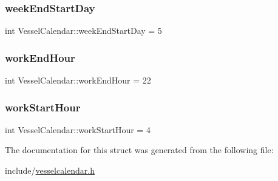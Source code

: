 \mbox{\label{struct_vessel_calendar_acde56a94cbb199b8b13590f4277256c0}} 
\subsubsection{\texorpdfstring{weekEndStartDay}{weekEndStartDay}}
{\footnotesize\ttfamily int Vessel\+Calendar\+::week\+End\+Start\+Day = 5}

\mbox{\label{struct_vessel_calendar_adcd498046edb0a7283604f2af13c091f}} 
\subsubsection{\texorpdfstring{workEndHour}{workEndHour}}
{\footnotesize\ttfamily int Vessel\+Calendar\+::work\+End\+Hour = 22}

\mbox{\label{struct_vessel_calendar_a54c064aac908013f15889226ec8b5d50}} 
\subsubsection{\texorpdfstring{workStartHour}{workStartHour}}
{\footnotesize\ttfamily int Vessel\+Calendar\+::work\+Start\+Hour = 4}



The documentation for this struct was generated from the following file\+:\begin{DoxyCompactItemize}
\item 
include/\mbox{\hyperlink{vesselcalendar_8h}{vesselcalendar.\+h}}\end{DoxyCompactItemize}
